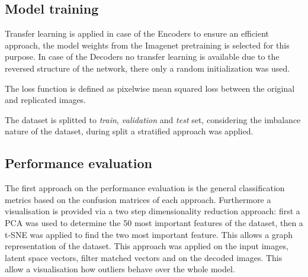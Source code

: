 \subsection{Model training}
Transfer learning is applied in case of the Encoders to ensure an efficient approach,
the model weights from the Imagenet pretraining is selected for this purpose.
In case of the Decoders no transfer learning is available due to the reversed structure
of the network, there only a random initialization was used.

The loss function is defined as pixelwise mean squared loss between the original and replicated
images.

The dataset is splitted to \emph{train}, \emph{validation} and \emph{test} set, considering the
imbalance nature of the dataset, during split a stratified approach was applied.

\subsection{Performance evaluation}
The first approach on the performance evaluation is the general classification metrics based on
the confusion matrices of each approach.
Furthermore a visualisation is provided via a two step dimensionality reduction approach:
first a PCA was used to determine the 50 most important features of the dataset,
then a t-SNE was applied to find the two most important feature.
This allows a graph representation of the dataset.
This approach was applied on the input images, latent space vectors, filter matched vectors and on
the decoded images.
This allow a visualisation how outliers behave over the whole model.

